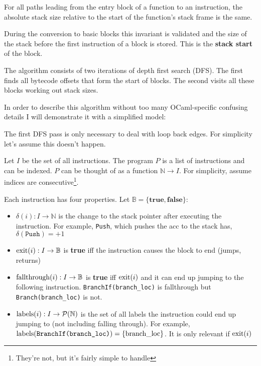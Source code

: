 \begin{framed}
      \noindent
      For all paths leading from the entry block of a function to an instruction, the absolute
      stack size
      relative to the start of the function's stack frame is the same.
\end{framed}

During the conversion to basic blocks this invariant is validated and the size of the stack before
the first instruction of a block is stored. This is the \textbf{stack start} of the block.


The algorithm consists of two iterations of depth first search (DFS). The first finds all bytecode
offsets that form the start of blocks. The second visits all these blocks working out stack sizes.

In order to describe this algorithm without too many OCaml-specific confusing details I will
demonstrate it with
a simplified model:

The first DFS pass is only necessary to deal with loop back edges. For simplicity let's assume this
doesn't happen.

Let \(I\) be the set of all instructions. The program \(P\) is a list of instructions and can be
indexed. \(P\) can be thought of as a function \(\mathbb{N} \to I\).
For simplicity, assume indices are consecutive\footnote{They're not, but it's fairly simple to
      handle}.

Each instruction has four properties. Let $\mathbb{B} = \{ \textbf{true}, \textbf{false} \}$:

\begin{itemize}
      \item \(\delta(i) : I \to \mathbb{N} \) is the change to the stack pointer after executing
            the
            instruction. For
            example, \texttt{Push}, which pushes the acc to the stack has, \(\delta(\texttt{Push})
            =
            +1\)
      \item \(\operatorname{exit}(i) : I \to \mathbb{B} \) is \textbf{true} iff the instruction causes
            the block to end
            (jumps, returns)
      \item \(\operatorname{fallthrough}(i) : I \to \mathbb{B} \) is \textbf{true} iff \(\operatorname{exit}(i)\)
            and it can end up
            jumping to the following instruction. \texttt{BranchIf(branch\_loc)} is fallthrough but
            \texttt{Branch(branch\_loc)} is not.
      \item \(\operatorname{labels}(i) : I \to \mathcal{P}(\mathbb{N}) \) is the set of all labels the
            instruction could end up jumping to
            (not
            including falling through). For example, \(\operatorname{labels}(\texttt{BranchIf(branch\_loc)}) =
            \{\text{branch\_loc}\}\). It is only relevant if \(\operatorname{exit}(i)\)
\end{itemize}

